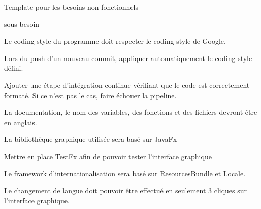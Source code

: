 \documentclass{article}
\begin{document}
\begin{nonfunctionnalneedbox}[F?: Titre]
    Template pour les besoins non fonctionnels
    \begin{subneedbox}[F?.?: Titre]
        sous besoin
    \end{subneedbox}
\end{nonfunctionnalneedbox}

\begin{nonfunctionnalneedbox}
    Le coding style du programme doit respecter le coding style de Google.
    \begin{subneedbox}
        Lors du push d'un nouveau commit, appliquer automatiquement le coding style défini.
    \end{subneedbox}
    \begin{subneedbox}
        Ajouter une étape d'intégration continue vérifiant que le code est correctement formaté.
        Si ce n'est pas le cas, faire échouer la pipeline.
    \end{subneedbox}
\end{nonfunctionnalneedbox}

\begin{nonfunctionnalneedbox}
    La documentation, le nom des variables, des fonctions et des fichiers devront être en anglais.
\end{nonfunctionnalneedbox}

\begin{nonfunctionnalneedbox}
    La bibliothèque graphique utilisée sera basé sur JavaFx
    \begin{subneedbox}
        Mettre en place TestFx afin de pouvoir tester l'interface graphique
    \end{subneedbox}
\end{nonfunctionnalneedbox}

\begin{nonfunctionnalneedbox}[F13: Internationalisation]
    Le framework d'internationalisation sera basé sur ResourcesBundle et Locale.
    \begin{subneedbox}
        Le changement de langue doit pouvoir être effectué en seulement 3 cliques
        sur l'interface graphique.
    \end{subneedbox}
\end{nonfunctionnalneedbox}
\end{document}
